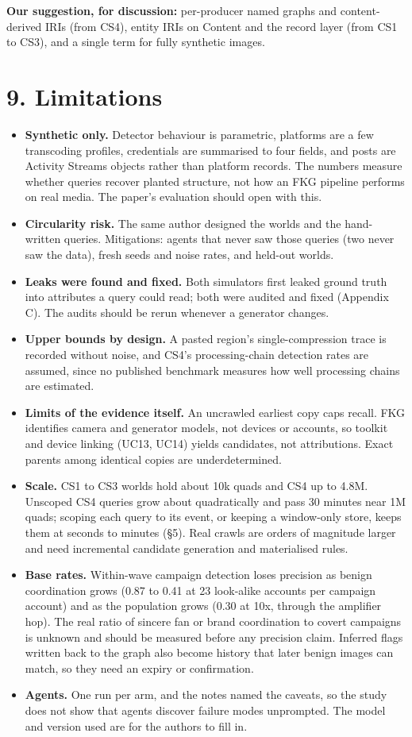 \documentclass[11pt]{article}
\begin{document}
\textbf{Our suggestion, for discussion:} per-producer named graphs and content-derived IRIs (from CS4), entity IRIs on Content and the record layer (from CS1 to CS3), and a single term for fully synthetic images.

\section*{9. Limitations}
\begin{itemize}
\item \textbf{Synthetic only.} Detector behaviour is parametric, platforms are a few transcoding profiles, credentials are summarised to four fields, and posts are Activity Streams objects rather than platform records. The numbers measure whether queries recover planted structure, not how an FKG pipeline performs on real media. The paper's evaluation should open with this.
\item \textbf{Circularity risk.} The same author designed the worlds and the hand-written queries. Mitigations: agents that never saw those queries (two never saw the data), fresh seeds and noise rates, and held-out worlds.
\item \textbf{Leaks were found and fixed.} Both simulators first leaked ground truth into attributes a query could read; both were audited and fixed (Appendix C). The audits should be rerun whenever a generator changes.
\item \textbf{Upper bounds by design.} A pasted region's single-compression trace is recorded without noise, and CS4's processing-chain detection rates are assumed, since no published benchmark measures how well processing chains are estimated.
\item \textbf{Limits of the evidence itself.} An uncrawled earliest copy caps recall. FKG identifies camera and generator models, not devices or accounts, so toolkit and device linking (UC13, UC14) yields candidates, not attributions. Exact parents among identical copies are underdetermined.
\item \textbf{Scale.} CS1 to CS3 worlds hold about 10k quads and CS4 up to 4.8M. Unscoped CS4 queries grow about quadratically and pass 30 minutes near 1M quads; scoping each query to its event, or keeping a window-only store, keeps them at seconds to minutes (§5). Real crawls are orders of magnitude larger and need incremental candidate generation and materialised rules.
\item \textbf{Base rates.} Within-wave campaign detection loses precision as benign coordination grows (0.87 to 0.41 at 23 look-alike accounts per campaign account) and as the population grows (0.30 at 10x, through the amplifier hop). The real ratio of sincere fan or brand coordination to covert campaigns is unknown and should be measured before any precision claim. Inferred flags written back to the graph also become history that later benign images can match, so they need an expiry or confirmation.
\item \textbf{Agents.} One run per arm, and the notes named the caveats, so the study does not show that agents discover failure modes unprompted. The model and version used are for the authors to fill in.
\end{itemize}
\end{document}
